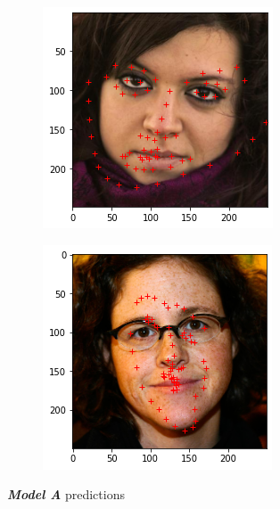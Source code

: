 \documentclass{article}
\begin{document}
\begin{figure}[h]
  \centering
  \begin{subfigure}[b]{0.35\textwidth}
    \includegraphics[width=\textwidth]{A1}
  \end{subfigure}
  \begin{subfigure}[b]{.35\textwidth}
    \includegraphics[width=\textwidth]{A5}
  \end{subfigure}
  \caption{\textbf{\textit{Model A}} predictions}
  \label{fig:model-A}
\end{figure}
\end{document}
